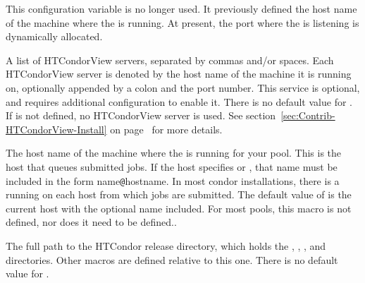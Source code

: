\begin{description}
\label{param:NegotiatorHost} 
\item[\Macro{NEGOTIATOR\_HOST}]
  This configuration variable is no longer used.
  It previously defined the host name of the machine where 
  the  is running.
  At present, the port where the  is listening 
  is dynamically allocated. 


\label{param:CondorViewHost}
\item[\Macro{CONDOR\_VIEW\_HOST}]
  A list of HTCondorView servers, separated by commas and/or spaces.
  Each HTCondorView server is denoted by the host name of the machine
  it is running on, optionally appended by a colon and the port number.
  This service is optional, and requires additional configuration 
  to enable it.  There is no default value for
  .  If  is not
  defined, no HTCondorView server is used.
  See section~\ref{sec:Contrib-HTCondorView-Install} on
  page~\pageref{sec:Contrib-HTCondorView-Install} for more details.

\label{param:ScheddHost}
\item[\Macro{SCHEDD\_HOST}]
  The host name of the machine where the  is running for
  your pool.  This is the host that queues submitted jobs.
  If the host specifies  or , that
  name must be included in the form name\verb$@$hostname.
  In most condor installations, there is a  running on
  each host from which jobs are submitted.  The default value of
   is the current host with the optional name included.  For most pools, this
  macro is not defined, nor does it need to be defined..

\label{param:ReleaseDir}
\item[\Macro{RELEASE\_DIR}]
  The full path to
  the HTCondor release directory, which holds the ,
  , , and  directories.  Other macros
  are defined relative to this one.  There is no default value for
  .


\end{description}
